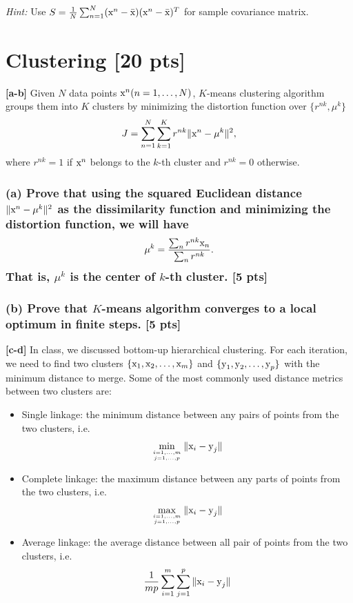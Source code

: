 \documentclass[twoside,10pt]{article}
\begin{document}
\emph{Hint:} Use $S = \frac{1}{N} \sum_{n=1}^N (\text x^n - \bar{\text x})(\text x^n -
\bar{\text x})^T$ for sample covariance matrix. \vspace{1cm}


\section{Clustering [20 pts]}

\textbf{[a-b]} Given $N$ data points $\text x^n (n=1,\dots,N)$, $K$-means clustering algorithm groups them into $K$ clusters by minimizing the distortion function over $\{ r^{nk}, \mu^k \}$
$$J=\sum_{n=1}^N\sum_{k=1}^Kr^{nk} \|\text x^n-\mu^k\|^2,$$
where $r^{nk}=1$ if $\text x^n$ belongs to the $k$-th cluster and $r^{nk}=0$ otherwise.

\subsubsection*{(a) Prove that using the squared Euclidean distance $\|\text x^n-\mu^k\|^2$ as the dissimilarity function and minimizing the distortion function, we will have 
   $$\mu^k=\frac{\sum_n r^{nk} \text x_n}{\sum_n r^{nk}}.$$
   That is, $\mu^k$ is the center of $k$-th cluster. [5 pts]}

\subsubsection*{(b) Prove that $K$-means algorithm converges to a local optimum in finite steps. [5 pts]}


\textbf{[c-d]} In class, we discussed bottom-up hierarchical clustering. For each iteration, we need to find two clusters $\{\text x_1, \text x_2, \dots, \text x_m\}$ and $\{\text y_1, \text y_2, \dots, \text y_p\}$ with the minimum distance to merge. Some of the most commonly used distance metrics between two clusters are:
    \begin{itemize}
    \item Single linkage: the minimum distance between any pairs of points from the two clusters, i.e.
    $$\min_{i=1,\dots,m \atop j=1,\dots, p}\|\text x_i - \text y_j\|$$
    \item Complete linkage: the maximum distance between any parts of points from the two clusters, i.e.
    $$\max_{i=1,\dots,m \atop j=1,\dots, p}\|\text x_i - \text y_j\|$$
    \item Average linkage: the average distance between all pair of points from the two clusters, i.e.
    $$\frac{1}{mp}\sum_{i=1}^m\sum_{j=1}^p\|\text x_i - \text y_j\|$$
    \end{itemize}
\end{document}
